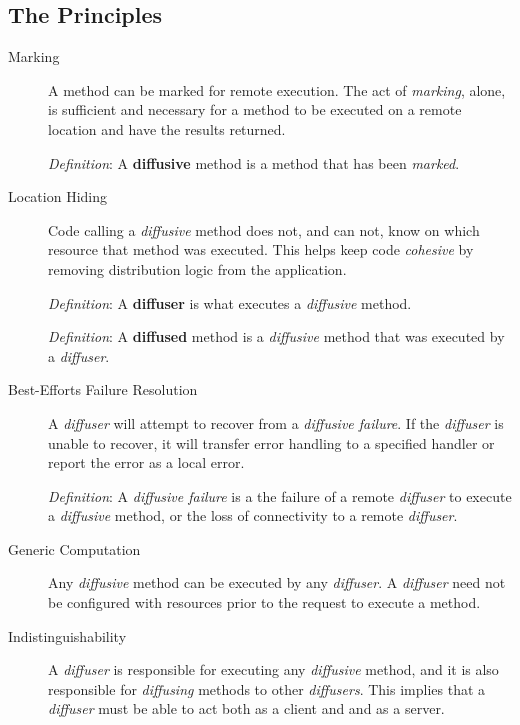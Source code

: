 \documentclass[11pt]{scrartcl}
\begin{document}
\subsection{The Principles}
\begin{description}

	\item[Marking] 
	A method can be marked for remote execution. The act of \emph{marking}, alone, is sufficient and necessary for a method to be executed on a remote location and have the results returned.
	
	\emph{Definition}: A \textbf{diffusive} method is a method that has been \emph{marked}.

	\item[Location Hiding]
	Code calling a \emph{diffusive} method does not, and can not, know on which resource that method was executed. This helps keep code \emph{cohesive} by removing distribution logic from the application. 
	
	\emph{Definition}: A \textbf{diffuser} is what executes a \emph{diffusive} method.
	
	\emph{Definition}: A \textbf{diffused} method is a \emph{diffusive} method that was executed by a \emph{diffuser}. 
	
	\item[Best-Efforts Failure Resolution]
	A \emph{diffuser} will attempt to recover from a \emph{diffusive failure}. If the \emph{diffuser} is unable to recover, it will transfer error handling to a specified handler or report the error as a local error.
	
	\emph{Definition}: A \emph{diffusive failure} is a the failure of a remote \emph{diffuser} to execute a \emph{diffusive} method, or the loss of connectivity to a remote \emph{diffuser}.
	
	\item[Generic Computation]
	Any \emph{diffusive} method can be executed by any \emph{diffuser}. A \emph{diffuser} need not be configured with resources prior to the request to execute a method.
	
	\item[Indistinguishability]
	A \emph{diffuser} is responsible for executing any \emph{diffusive} method, and it is also responsible for \emph{diffusing} methods to other \emph{diffusers}. This implies that a \emph{diffuser} must be able to act both as a client and and as a server.
	

\end{description}
\end{document}
